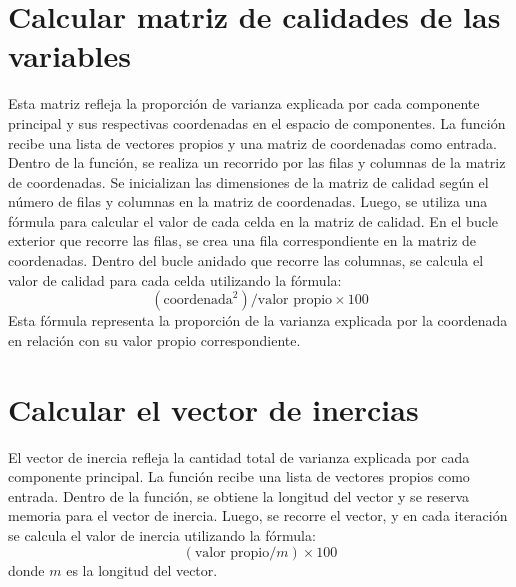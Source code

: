 \documentclass{article}
\begin{document}
\section{Calcular matriz de calidades de las variables}
Esta matriz refleja la proporción de varianza explicada por cada componente principal y sus respectivas coordenadas en el espacio de componentes. La función recibe una lista de vectores propios y una matriz de coordenadas como entrada. Dentro de la función, se realiza un recorrido por las filas y columnas de la matriz de coordenadas. Se inicializan las dimensiones de la matriz de calidad según el número de filas y columnas en la matriz de coordenadas. Luego, se utiliza una fórmula para calcular el valor de cada celda en la matriz de calidad. En el bucle exterior que recorre las filas, se crea una fila correspondiente en la matriz de coordenadas. Dentro del bucle anidado que recorre las columnas, se calcula el valor de calidad para cada celda utilizando la fórmula: 
\[ \left(\text{coordenada}^2\right) / \text{valor propio} \times 100 \]
Esta fórmula representa la proporción de la varianza explicada por la coordenada en relación con su valor propio correspondiente.

\section{Calcular el vector de inercias}
El vector de inercia refleja la cantidad total de varianza explicada por cada componente principal. La función recibe una lista de vectores propios como entrada. Dentro de la función, se obtiene la longitud del vector y se reserva memoria para el vector de inercia. Luego, se recorre el vector, y en cada iteración se calcula el valor de inercia utilizando la fórmula: 
\[ \left(\text{valor propio} / m\right) \times 100 \]
donde \( m \) es la longitud del vector.
\end{document}
